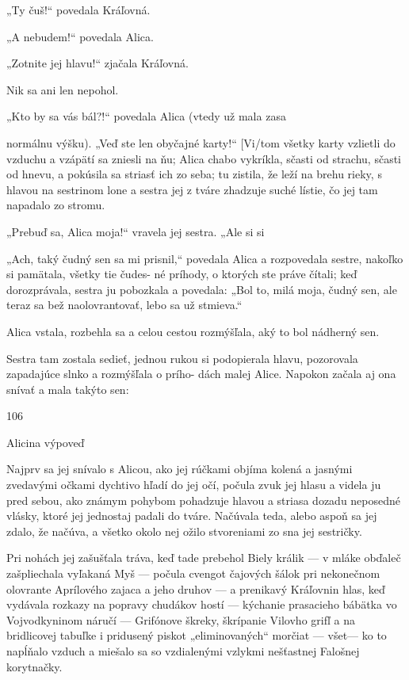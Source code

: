 \documentclass[12pt]{article}
\begin{document}
\begin{Parallel}[p]{}{}
{{„Ty čuš!“ povedala Kráľovná.

„A nebudem!“ povedala Alica.

„Zotnite jej hlavu!“ zjačala Kráľovná.

Nik sa ani len nepohol.

„Kto by sa vás bál?!“ povedala Alica (vtedy už mala zasa

normálnu výšku). „Veď ste len obyčajné karty!“
[Vi/tom všetky karty vzlietli do vzduchu a vzápätí sa zniesli
na ňu; Alica chabo vykríkla, sčasti od strachu, sčasti od
hnevu, a pokúsila sa striasť ich zo seba; tu zistila, že leží na
brehu rieky, s hlavou na sestrinom lone a sestra jej z tváre
zhadzuje suché lístie, čo jej tam napadalo zo stromu.

„Prebuď sa, Alica moja!“ vravela jej sestra. „Ale si si

„Ach, taký čudný sen sa mi prisnil,“ povedala Alica
a rozpovedala sestre, nakoľko si pamätala, všetky tie čudes-
né príhody, o ktorých ste práve čítali; keď dorozprávala,
sestra ju pobozkala a povedala: „Bol to, milá moja, čudný
sen, ale teraz sa bež naolovrantovať, lebo sa už stmieva.“

Alica vstala, rozbehla sa a celou cestou rozmýšľala, aký to
bol nádherný sen.

Sestra tam zostala sedieť, jednou rukou si podopierala
hlavu, pozorovala zapadajúce slnko a rozmýšľala o prího-
dách malej Alice. Napokon začala aj ona snívať a mala
takýto sen:

106

Alicina výpoveď

Najprv sa jej snívalo s Alicou, ako jej rúčkami objíma
kolená a jasnými zvedavými očkami dychtivo hľadí do jej
očí, počula zvuk jej hlasu a videla ju pred sebou, ako
známym pohybom pohadzuje hlavou a striasa dozadu
neposedné vlásky, ktoré jej jednostaj padali do tváre.
Načúvala teda, alebo aspoň sa jej zdalo, že načúva, a všetko
okolo nej ožilo stvoreniami zo sna jej sestričky.

Pri nohách jej zašušťala tráva, keď tade prebehol Biely
králik — v mláke obďaleč zašpliechala vyľakaná Myš
— počula cvengot čajových šálok pri nekonečnom olovrante
Aprílového zajaca a jeho druhov — a prenikavý Kráľovnin
hlas, keď vydávala rozkazy na popravy chudákov hostí
— kýchanie prasacieho bábätka vo Vojvodkyninom náručí
— Grifónove škreky, škrípanie Vilovho grifľ a na bridlicovej
tabuľke i pridusený piskot „eliminovaných“ morčiat — všet—
ko to napĺňalo vzduch a miešalo sa so vzdialenými vzlykmi
nešťastnej Falošnej korytnačky.

}}
\end{Parallel}
\end{document}
